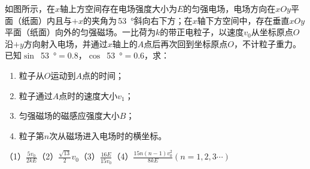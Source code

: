 如图所示，在\(x\)轴上方空间存在电场强度大小为\(E\)的匀强电场，电场方向在\(xOy\)平面（纸面）内且与\( + x\)的夹角为\,\qty{53}{\degree}斜向右下方；在\(x\)轴下方空间中，存在垂直\(xOy\)平面（纸面）向外的匀强磁场。一比荷为\(k\)的带正电粒子，以速度\(v_0\)从坐标原点\(O\)沿\( + y\)方向射入电场，并通过\(x\)轴上的\(A\)点后再次回到坐标原点\(O\)，不计粒子重力。已知\(\sin\) \,\qty{53}{\degree}\( = 0.8\)，\(\cos\) \,\qty{53}{\degree}\( = 0.6\)，求：
\begin{enumerate}
    \item 粒子从\(O\)运动到\(A\)点的时间；
    \item 粒子通过\(A\)点时的速度大小\(v_1\)；
    \item 匀强磁场的磁感应强度大小\(B\)；
    \item 粒子第\(n\)次从磁场进入电场时的横坐标。
\end{enumerate}
\begin{answer}
    （1）\(\frac{5v_0}{2kE}\)（2）\(\frac{\sqrt{13}}{2}v_0 \)（3）\(\frac{16E}{15v_0}\)（4）\(\frac{15n(n - 1)v_0^2}{8kE}(n =1,2,3\cdots)\)
\end{answer}